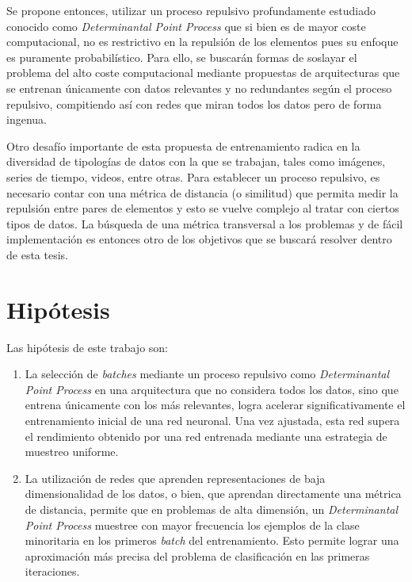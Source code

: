 \vspace{0.2cm}

Se propone entonces, utilizar un proceso repulsivo profundamente estudiado conocido como \textit{Determinantal Point Process} que si bien es de mayor coste computacional, no es restrictivo en la repulsión de los elementos pues su enfoque es puramente probabilístico. Para ello, se buscarán formas de soslayar el problema del alto coste computacional mediante propuestas de arquitecturas que se entrenan únicamente con datos relevantes y no redundantes según el proceso repulsivo, compitiendo así con redes que miran todos los datos pero de forma ingenua. 

\vspace{0.2cm}


Otro desafío importante de esta propuesta de entrenamiento radica en la diversidad de tipologías de datos con la que se trabajan, tales como imágenes, series de tiempo, videos, entre otras. Para establecer un proceso repulsivo, es necesario contar con una métrica de distancia (o similitud) que permita medir la repulsión entre pares de elementos y esto se vuelve complejo al tratar con ciertos tipos de datos. La búsqueda de una métrica transversal a los problemas y de fácil implementación es entonces otro de los objetivos que se buscará resolver dentro de esta tesis. 



\section{Hipótesis}

Las hipótesis de este trabajo son: 

\begin{enumerate}

    \item  La selección de \textit{batches} mediante un proceso repulsivo como \textit{Determinantal Point Process} en una arquitectura que no considera todos los datos, sino que entrena únicamente con los más relevantes, logra acelerar significativamente el entrenamiento inicial de una red neuronal. Una vez ajustada, esta red supera el rendimiento obtenido por una red entrenada mediante una estrategia de muestreo uniforme.
    
    \item La utilización de redes que aprenden representaciones de baja dimensionalidad de los datos, o bien, que aprendan directamente una métrica de distancia, permite que en problemas de alta dimensión, un \textit{Determinantal Point Process} muestree con mayor frecuencia los ejemplos de la clase minoritaria en los primeros \textit{batch} del entrenamiento. Esto permite lograr una aproximación más precisa del problema de clasificación en las primeras iteraciones. 

    
\end{enumerate}


